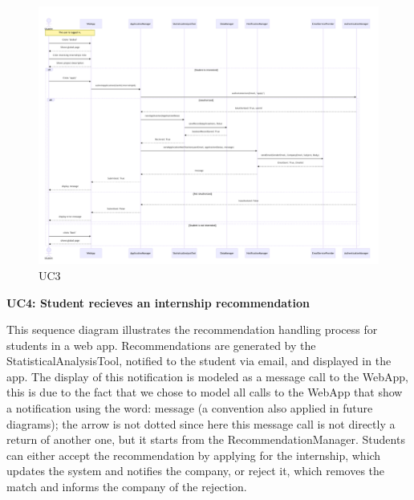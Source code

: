 \begin{figure}[H]
    \centering
    \includegraphics[width=1.1\linewidth]{DD//Images/SequenceDiagrams/UC3.pdf}
    \caption{UC3}
\end{figure}

\newpage
\textbf{UC4: Student recieves an internship recommendation}

This sequence diagram illustrates the recommendation handling process for students in a web app. Recommendations are generated by the StatisticalAnalysisTool, notified to the student via email, and displayed in the app. The display of this notification is modeled as a message call to the WebApp, this is due to the fact that we chose to model all calls to the WebApp that show a notification using the word: message (a convention also applied in future diagrams); the arrow is not dotted since here this message call is not directly a return of another one, but it starts from the RecommendationManager. Students can either accept the recommendation by applying for the internship, which updates the system and notifies the company, or reject it, which removes the match and informs the company of the rejection.


